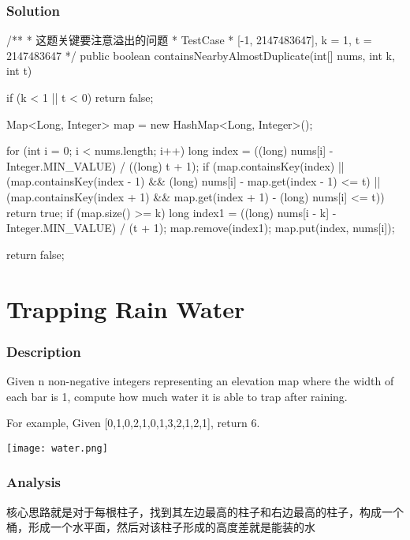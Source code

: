 \subsubsection{Solution}

\begin{Code}
/**
 * 这题关键要注意溢出的问题
 * TestCase
 * [-1, 2147483647], k = 1, t = 2147483647
 */
public boolean containsNearbyAlmostDuplicate(int[] nums, int k, int t) {
    if (k < 1 || t < 0) {
        return false;
    }

    Map<Long, Integer> map = new HashMap<Long, Integer>();

    for (int i = 0; i < nums.length; i++) {
        long index = ((long) nums[i] - Integer.MIN_VALUE) / ((long) t + 1);
        if (map.containsKey(index) ||
                (map.containsKey(index - 1) && (long) nums[i] - map.get(index - 1) <= t)
                || (map.containsKey(index + 1) && map.get(index + 1) - (long) nums[i] <= t)) {
            return true;
        }
        if (map.size() >= k) {
            long index1 = ((long) nums[i - k] - Integer.MIN_VALUE) / (t + 1);
            map.remove(index1);
        }
        map.put(index, nums[i]);
    }

    return false;
 }
\end{Code}

\newpage

\section{Trapping Rain Water} %

\subsubsection{Description}
Given n non-negative integers representing an elevation map where the width of each bar is 1, compute how much water it is able to trap after raining.

For example,
Given [0,1,0,2,1,0,1,3,2,1,2,1], return 6.

\begin{center}
\texttt{[image: water.png]}\\
\end{center}

\subsubsection{Analysis}
核心思路就是对于每根柱子，找到其左边最高的柱子和右边最高的柱子，构成一个桶，形成一个水平面，然后对该柱子形成的高度差就是能装的水

